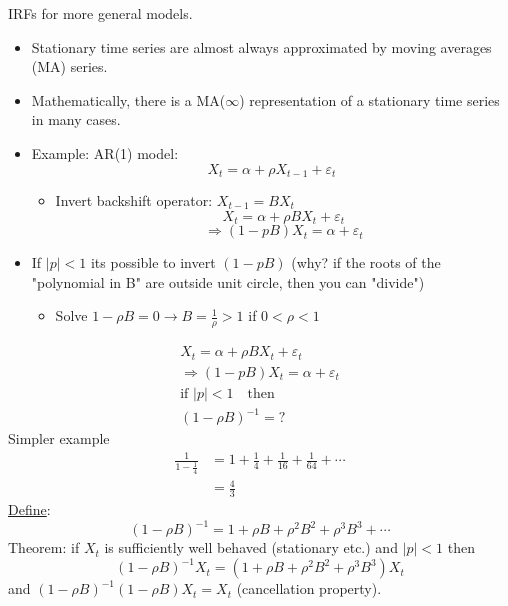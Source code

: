IRFs for more general models.
\begin{itemize}
    \item Stationary time series are almost always approximated by moving averages (MA) series.
    \item Mathematically, there is a MA($\infty$) representation of a stationary time series in many cases. 
    \item Example: AR(1) model:
    \[
    X_t = \alpha + \rho X_{t-1}+\varepsilon_t
    \]
    \begin{itemize}
        \item Invert backshift operator: $X_{t-1}=BX_t$ \[
        X_t= \alpha+\rho BX_t +\varepsilon_t
        \]\[
        \Rightarrow (1-pB)X_t=\alpha+\varepsilon_t
        \]
    \end{itemize}
    \item If $|p|<1$ its possible to invert $(1-pB)$ (why? if the roots of the "polynomial in B" are outside unit circle, then you can "divide")
    \begin{itemize}
        \item Solve $1-\rho B = 0 \longrightarrow B = \frac{1}{\rho} > 1$ if $0<\rho<1$
    \end{itemize}
\end{itemize}
\begin{align*}
    X_t= \alpha+\rho BX_t +\varepsilon_t\\  
    \Rightarrow (1-pB)X_t=\alpha+\varepsilon_t \\
    \text{if } |p|<1 \quad \text{then}\\
    (1-\rho B)^{-1} = ?
\end{align*}
Simpler example 
\begin{align*}
    \frac{1}{1-\frac{1}{4}} &= 1+\frac{1}{4} + \frac{1}{16} + \frac{1}{64} + \cdots \\
    &= \frac{4}{3}
\end{align*}
\underline{Define}: \[
(1-\rho B)^{-1}= 1+\rho B + \rho^2 B^2 + \rho^3 B^3 + \cdots
\]
Theorem: if $X_t$ is sufficiently well behaved (stationary etc.) and $|p|<1$ then \[
(1-\rho B)^{-1}X_t= (1+\rho B + \rho^2 B^2 + \rho^3 B^3)X_t
\]
and $(1-\rho B)^{-1} (1-\rho B) X_t = X_t$ (cancellation property).

